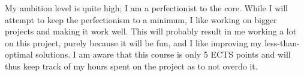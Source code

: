 My ambition level is quite high; I am a perfectionist to the core. While I will
attempt to keep the perfectionism to a minimum, I like working on bigger
projects and making it work well. This will probably result in me working a lot
on this project, purely because it will be fun, and I like improving my
less-than-optimal solutions. I am aware that this course is only 5 ECTS points
and will thus keep track of my hours spent on the project as to not overdo it. 

